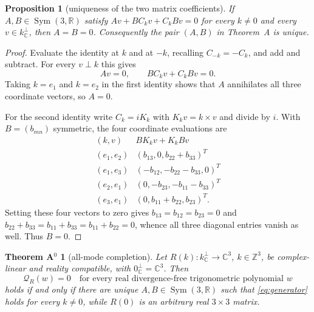 \documentclass[11pt]{article}
\newtheorem{proposition}[theorem]{Proposition}
\theoremstyle{definition}
\theoremstyle{remark}
\theoremstyle{plain}
\newtheorem*{thmAzero}{Theorem A$^{0}$}
\DeclareMathOperator{\Sym}{Sym}
\newcommand{\Z}{\mathbb{Z}}
\newcommand{\R}{\mathbb{R}}
\newcommand{\C}{\mathbb{C}}
\newcommand{\Qform}{\mathcal{Q}}
\newcommand{\Ck}{C_k}
\newcommand{\kperp}{k_{\C}^{\perp}}
\begin{document}
\begin{proposition}[uniqueness of the two matrix coefficients]
\label{prop:uniqueness}
If $A,B\in\Sym(3,\R)$ satisfy
$Av+B\Ck v+\Ck Bv=0$ for every $k\ne0$ and every $v\in\kperp$, then $A=B=0$.
Consequently the pair $(A,B)$ in Theorem~A is unique.
\end{proposition}

\begin{proof}
Evaluate the identity at $k$ and at $-k$, recalling $C_{-k}=-\Ck$, and add and
subtract. For every $v\perp k$ this gives
\[
Av=0,
\qquad
B\Ck v+\Ck Bv=0 .
\]
Taking $k=e_{1}$ and $k=e_{2}$ in the first identity shows that $A$ annihilates
all three coordinate vectors, so $A=0$.

For the second identity write $\Ck=iK_{k}$ with $K_{k}v=k\times v$ and divide
by $i$. With $B=(b_{mn})$ symmetric, the four coordinate evaluations are
\[
\begin{array}{c|c}
(k,v)&BK_{k}v+K_{k}Bv\\ \hline
(e_{1},e_{2})&(b_{13},0,b_{22}+b_{33})^{T}\\
(e_{1},e_{3})&(-b_{12},-b_{22}-b_{33},0)^{T}\\
(e_{2},e_{1})&(0,-b_{23},-b_{11}-b_{33})^{T}\\
(e_{3},e_{1})&(0,b_{11}+b_{22},b_{23})^{T}.
\end{array}
\]
Setting these four vectors to zero gives
$b_{13}=b_{12}=b_{23}=0$ and
$b_{22}+b_{33}=b_{11}+b_{33}=b_{11}+b_{22}=0$, whence all three diagonal
entries vanish as well. Thus $B=0$.
\end{proof}

\begin{thmAzero}[all-mode completion]
\label{thm:Azero}
Let $R(k):\kperp\to\C^{3}$, $k\in\Z^{3}$, be complex-linear and reality
compatible, with $0_{\C}^{\perp}=\C^{3}$. Then
\begin{equation}
\label{eq:universal-allmode}
\Qform_{R}(w)=0
\quad\text{for every real divergence-free trigonometric polynomial }w
\end{equation}
holds if and only if there are unique $A,B\in\Sym(3,\R)$ such that
\eqref{eq:generator} holds for every $k\ne0$, while $R(0)$ is an arbitrary
real $3\times3$ matrix.
\end{thmAzero}
\end{document}
